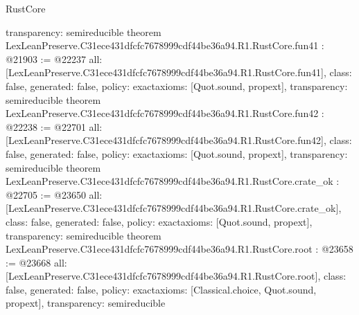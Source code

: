 \begin{lexlean}{RustCore}
\begin{coremodule}
{  transparency: semireducible
}
theorem LexLeanPreserve.C31ece431dfcfc7678999cdf44be36a94.R1.RustCore.fun41 : @21903 := @22237 {
  all: [LexLeanPreserve.C31ece431dfcfc7678999cdf44be36a94.R1.RustCore.fun41],
  class: false,
  generated: false,
  policy: exact{axioms: [Quot.sound, propext]},
  transparency: semireducible
}
theorem LexLeanPreserve.C31ece431dfcfc7678999cdf44be36a94.R1.RustCore.fun42 : @22238 := @22701 {
  all: [LexLeanPreserve.C31ece431dfcfc7678999cdf44be36a94.R1.RustCore.fun42],
  class: false,
  generated: false,
  policy: exact{axioms: [Quot.sound, propext]},
  transparency: semireducible
}
theorem LexLeanPreserve.C31ece431dfcfc7678999cdf44be36a94.R1.RustCore.crate_ok : @22705 := @23650 {
  all: [LexLeanPreserve.C31ece431dfcfc7678999cdf44be36a94.R1.RustCore.crate_ok],
  class: false,
  generated: false,
  policy: exact{axioms: [Quot.sound, propext]},
  transparency: semireducible
}
theorem LexLeanPreserve.C31ece431dfcfc7678999cdf44be36a94.R1.RustCore.root : @23658 := @23668 {
  all: [LexLeanPreserve.C31ece431dfcfc7678999cdf44be36a94.R1.RustCore.root],
  class: false,
  generated: false,
  policy: exact{axioms: [Classical.choice, Quot.sound, propext]},
  transparency: semireducible
}


\end{coremodule}
\end{lexlean}
